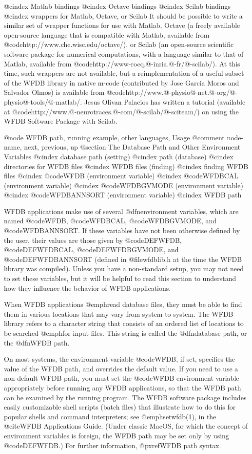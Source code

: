 {{@cindex Matlab bindings
@cindex Octave bindings
@cindex Scilab bindings
@cindex wrappers for Matlab, Octave, or Scilab
It should be possible to write a similar set of wrapper functions for use with
Matlab, Octave (a freely available open-source language that is compatible with
Matlab, available from @code{http://www.che.wisc.edu/octave/}), or Scilab (an
open-source scientific software package for numerical computations, with a
language similar to that of Matlab, available from
@code{http://www-rocq.@-inria.@-fr/@-scilab/}).  At this time, such wrappers
are not available, but a reimplementation of a useful subset of the WFDB
library in native m-code (contributed by Jose Garcia Moros and Salvador Olmos)
is available from
@code{http://www.@-physio@-net.@-org/@-physio@-tools/@-matlab/}.  Jesus Olivan
Palacios has written a tutorial (available at
@code{http://www.@-neurotraces.@-com/@-scilab/@-sciteam/}) on using the WFDB
Software Package with Scilab.

@node     WFDB path, running example, other languages, Usage
@comment  node-name,  next,  previous,  up
@section The Database Path and Other Environment Variables
@cindex database path (setting)
@cindex path (database)
@cindex directories for WFDB files
@cindex WFDB files (finding)
@cindex finding WFDB files
@cindex @code{WFDB} (environment variable)
@cindex @code{WFDBCAL} (environment variable)
@cindex @code{WFDBGVMODE} (environment variable)
@cindex @code{WFDBANNSORT} (environment variable)
@cindex WFDB path

WFDB applications make use of several @dfn{environment variables}, which are
named @code{WFDB}, @code{WFDBCAL}, @code{WFDBGVMODE}, and @code{WFDBANNSORT}.
If these variables have not been otherwise defined by the user, their values
are those given by @code{DEFWFDB}, @code{DEFWFDBCAL}, @code{DEFWFDBGVMODE},
and @code{DEFWFDBANNSORT} (defined in @file{wfdblib.h} at the
time the WFDB library was compiled).  Unless you have a non-standard
setup, you may not need to set these variables, but it will be helpful
to read this section to understand how they influence the behavior of
WFDB applications.

When WFDB applications @emph{read} database files, they must be able to
find them in various locations that may vary from system to system.  The
WFDB library refers to a character string that consists of an ordered
list of locations to be searched @emph{for input files}.  This string is
called the @dfn{database path}, or the @dfn{WFDB path}.

On most systems, the environment variable @code{WFDB}, if set, specifies
the value of the WFDB path, and overrides the default value.  If you
need to use a non-default WFDB path, you must set the @code{WFDB}
environment variable appropriately before running any WFDB applications,
so that the WFDB path can be examined by the running program.  The WFDB
software package includes easily customizable shell scripts (batch
files) that illustrate how to do this for popular shells and command
interpreters; see @emph{setwfdb}(1), in the @cite{WFDB Applications
Guide}.  (Under classic MacOS, for which the concept of environment
variables is foreign, the WFDB path may be set only by using
@code{DEFWFDB}.)  For further information, @pxref{WFDB path syntax}.

}}
